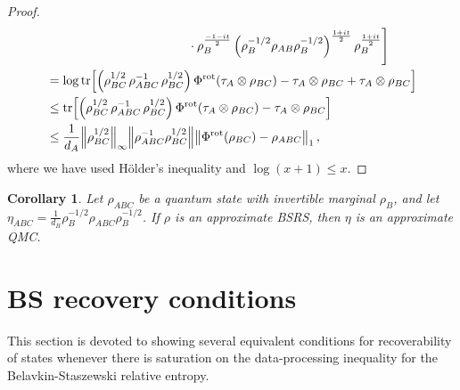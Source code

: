 \documentclass[11pt]{article}
\theoremstyle{newdefinition}
\theoremstyle{newplain}
\newtheorem{corollary}[definition]{Corollary}
\theoremstyle{myplain}
\DeclareMathOperator{\1}{\mathds{1}}
\newcommand{\PCR}[1]{{\color{blue}#1}}
\newcommand{\AC}[1]{{\color{green}#1}}
\begin{document}
{\begin{proof}
\begin{align}
    & \hspace{4cm} \cdot \rho_B^{\frac{-1-it}{2}} \left(\rho_B^{-1/2}\rho_{AB}\rho_B^{-1/2}\right)^{\frac{1+it}{2}}  \rho_B^{\frac{1+it}{2}}   \Bigg] \\
    & = \log \tr[ \left( \rho_{BC}^{1/2} \, \rho_{ABC}^{-1} \, \rho_{BC}^{1/2}  \right) \Phi^{\text{rot}} (\tau_A \otimes \rho_{BC}) - \tau_A \otimes \rho_{BC} + \tau_A \otimes \rho_{BC}] \\
    & \leq \tr[ \left( \rho_{BC}^{1/2} \, \rho_{ABC}^{-1} \, \rho_{BC}^{1/2}  \right) \Phi^{\text{rot}} (\tau_A \otimes \rho_{BC}) - \tau_A \otimes \rho_{BC}] \\
    & \leq \frac{1}{d_A} \norm{\rho_{BC}^{1/2}}_\infty \norm{\rho_{ABC}^{-1} \rho_{BC}^{1/2}} \norm{  \Phi^{\text{rot}} (\rho_{BC}) -\rho_{ABC}}_1 \, ,
\end{align}
where we have used Hölder's inequality and $\log(x+1)\leq x$. 
    
\end{proof}


\begin{corollary}
    Let $\rho_{ABC}$ be a quantum state with invertible marginal $\rho_B$, and let $\eta_{ABC}= \frac{1}{d_B} \rho_B^{-1/2} \rho_{ABC}\rho_B^{-1/2} $. If $\rho$ is an approximate BSRS, then $\eta$ is an approximate QMC. 
\end{corollary}


\section{BS recovery conditions}

This section is devoted to showing several equivalent conditions for recoverability of states whenever there is saturation on the data-processing inequality for the Belavkin-Staszewski relative entropy. 



}
\end{document}
